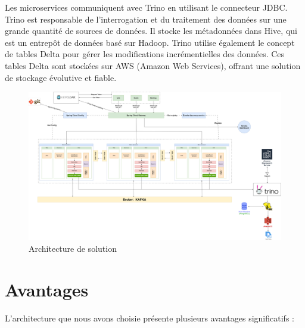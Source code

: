 Les microservices communiquent avec Trino en utilisant le connecteur JDBC\@. Trino est responsable de l'interrogation et du traitement des données sur une grande quantité de sources de données. Il stocke les métadonnées dans Hive, qui est un entrepôt de données basé sur Hadoop. Trino utilise également le concept de tables Delta pour gérer les modifications incrémentielles des données. Ces tables Delta sont stockées sur AWS (Amazon Web Services), offrant une solution de stockage évolutive et fiable.

\begin{figure}[H]
\centering
\includegraphics[width=\linewidth]{images/architecture-solution.png}
\caption{Architecture de solution}\label{fig:solution}
\end{figure}

\section{Avantages}

L'architecture que nous avons choisie présente plusieurs avantages significatifs :

